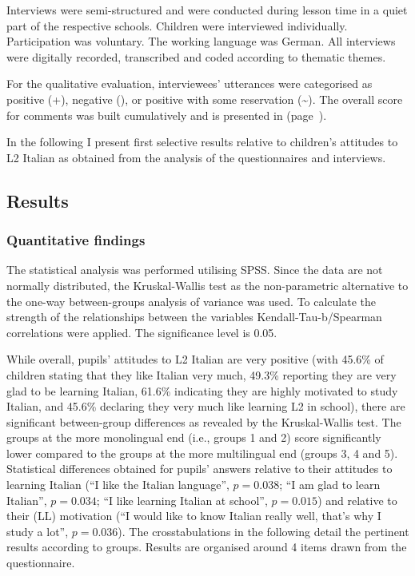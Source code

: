 \documentclass[output=paper]{../langscibook}
\begin{document}


Interviews were semi-structured and were conducted during lesson time in a quiet part of the respective schools. Children were interviewed individually. Participation was voluntary. The working language was German. All interviews were digitally recorded, transcribed and coded according to thematic themes. 

For the qualitative evaluation, interviewees’ utterances were categorised as positive (+), negative (\textminus), or positive with some reservation ({\textasciitilde}). The overall score for comments was built cumulatively and is presented in  (page~\pageref{tab:7:5}). 

In the following I present first selective results relative to children’s attitudes to L2 Italian as obtained from the analysis of the questionnaires and interviews.


\subsection{Results}
\subsubsection{Quantitative findings}


The statistical analysis was performed utilising SPSS. Since the data are not normally distributed, the Kruskal-Wallis test as the non-parametric alternative to the one-way between-groups analysis of variance was used. To calculate the strength of the relationships between the variables Kendall-Tau-b\slash Spearman correlations were applied. The significance level is 0.05.

While overall, pupils’ attitudes to L2 Italian are very positive (with 45.6\% of children stating that they like Italian very much, 49.3\% reporting they are very glad to be learning Italian, 61.6\% indicating they are highly motivated to study Italian, and 45.6\% declaring they very much like learning L2 in school), there are significant between-group differences as revealed by the Kruskal-Wallis test. The groups at the more monolingual end (i.e., groups 1 and 2) score significantly lower compared to the groups at the more multilingual end (groups 3, 4 and 5). Statistical differences obtained for pupils’ answers relative to their attitudes to learning Italian (“I like the Italian language”, $p = 0.038$; “I am glad to learn Italian”, $p = 0.034$; “I like learning Italian at school”, $p = 0.015$) and relative to their (LL) motivation (“I would like to know Italian really well, that's why I study a lot”, $p = 0.036$). The crosstabulations in the following detail the pertinent results according to groups. Results are organised around 4 items drawn from the questionnaire.
\end{document}
